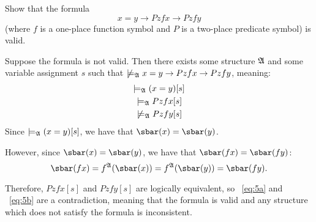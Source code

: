 \begin{problem}[5]
  Show that the formula
  \[ x = y \to P zfx \to P z fy  \]
  (where $f$ is a one-place function symbol and $P$ is a two-place predicate symbol)
  is valid.
\end{problem}
\begin{Answer}
  Suppose the formula is not valid.
  Then there exists some structure $\mathfrak{A}$ and some variable assignment $s$ such that
  $\not \models_{\mathfrak{A}} x = y \to P zfx \to P z fy$,
   meaning:
  \begin{align}
    \models_{\mathfrak{A}} (x = y) [s] \\
    \models_{\mathfrak{A}} P zfx [s]~\label{eq:5a} \\
    \not \models_{\mathfrak{A}} P z fy [s] ~\label{eq:5b}
  \end{align}
  Since $\models_{\mathfrak{A}} (x = y) [s]$, we have that $\sbar(x) = \sbar(y)$.

  \step
  However, since $\sbar(x) = \sbar(y)$, we have that $\sbar(fx) = \sbar(fy)$:
  \[ \sbar(fx) = f^{\frakA}(\sbar(x)) = f^{\frakA}(\sbar(y)) = \sbar(fy). \]

  \step
  Therefore, $P z fx [s]$ and $P z fy [s]$ are logically equivalent,
  so ~\ref{eq:5a} and ~\ref{eq:5b} are a contradiction,
  meaning that the formula is valid and any structure which does not satisfy
  the formula is inconsistent.
\end{Answer}
